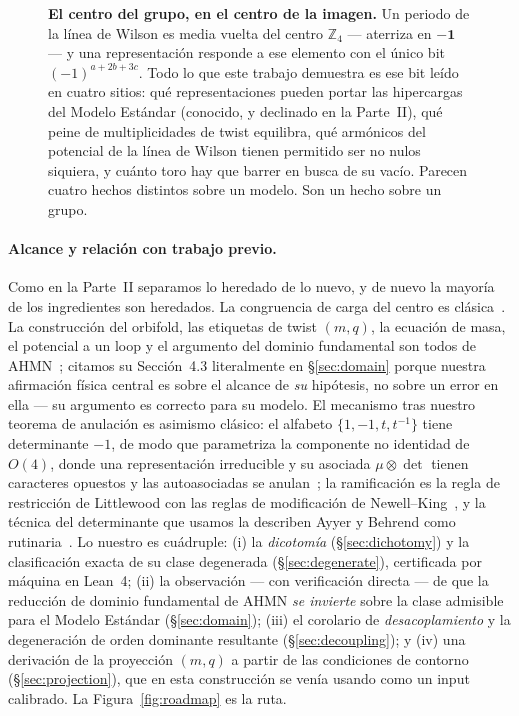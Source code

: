\documentclass[11pt,a4paper]{article}
\newcommand{\ZZ}{\mathbb{Z}}
\begin{document}
\begin{figure}[!t]
\caption{\textbf{El centro del grupo, en el centro de la imagen.} Un periodo de la línea de
Wilson es media vuelta del centro $\ZZ_4$ --- aterriza en $-\mathbf{1}$ --- y una
representación responde a ese elemento con el único bit $(-1)^{a+2b+3c}$. Todo lo que este
trabajo demuestra es ese bit leído en cuatro sitios: qué representaciones pueden portar las
hipercargas del Modelo Estándar (conocido, y declinado en la Parte~II), qué peine de
multiplicidades de twist equilibra, qué armónicos del potencial de la línea de Wilson tienen
permitido ser no nulos siquiera, y cuánto toro hay que barrer en busca de su vacío. Parecen
cuatro hechos distintos sobre un modelo. Son un hecho sobre un grupo.}
\label{fig:chain}
\end{figure}

\paragraph{Alcance y relación con trabajo previo.} Como en la Parte~II separamos lo heredado
de lo nuevo, y de nuevo la mayoría de los ingredientes son heredados. La congruencia de carga
del centro es clásica~\cite{Hucks,Saller,Tong,Alonso,Slansky}. La construcción del orbifold,
las etiquetas de twist $(m,q)$, la ecuación de masa, el potencial a un loop y el argumento del
dominio fundamental son todos de AHMN~\cite{AHMN}; citamos su Sección~4.3 literalmente en
\S\ref{sec:domain} porque nuestra afirmación física central es sobre el alcance de \emph{su}
hipótesis, no sobre un error en ella --- su argumento es correcto para su modelo. El
mecanismo tras nuestro teorema de anulación es asimismo clásico: el alfabeto
$\{1,-1,t,t^{-1}\}$ tiene determinante $-1$, de modo que parametriza la componente no identidad
de $O(4)$, donde una representación irreducible y su asociada $\mu\otimes\det$ tienen
caracteres opuestos y las autoasociadas se anulan~\cite{Brauer}; la ramificación es la regla
de restricción de Littlewood con las reglas de modificación de Newell--King~\cite{King71,Newell,Brauer},
y la técnica del determinante que usamos la describen Ayyer y Behrend como
rutinaria~\cite{AyyerBehrend}. Lo nuestro es cuádruple: (i) la \emph{dicotomía}
(\S\ref{sec:dichotomy}) y la clasificación exacta de su clase degenerada
(\S\ref{sec:degenerate}), certificada por máquina en Lean~4; (ii) la observación --- con
verificación directa --- de que la reducción de dominio fundamental de AHMN \emph{se
invierte} sobre la clase admisible para el Modelo Estándar (\S\ref{sec:domain}); (iii) el
corolario de \emph{desacoplamiento} y la degeneración de orden dominante resultante
(\S\ref{sec:decoupling}); y (iv) una derivación de la proyección $(m,q)$ a partir de las
condiciones de contorno (\S\ref{sec:projection}), que en esta construcción se venía usando
como un input calibrado. La Figura~\ref{fig:roadmap} es la ruta.
\end{document}
